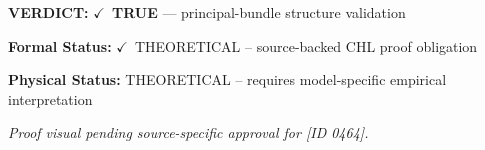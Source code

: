\textbf{VERDICT:} \ensuremath{\checkmark}\ \textbf{TRUE} --- principal-bundle structure validation

\textbf{Formal Status:} \ensuremath{\checkmark}\ THEORETICAL -- source-backed CHL proof obligation

\textbf{Physical Status:} THEORETICAL -- requires model-specific empirical interpretation
\par\vspace{0.45em}
\par
\vfill
\begingroup\footnotesize\itshape
Proof visual pending source-specific approval for [ID 0464].
\par\endgroup
\vfill
\endgroup
\endgroup
